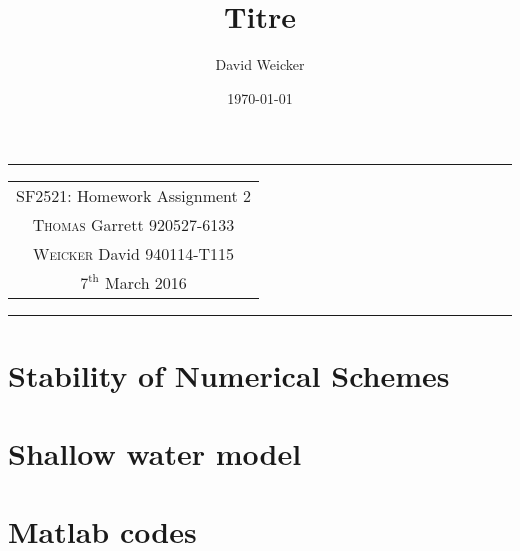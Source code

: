 \documentclass[11pt,a4paper]{article}
\title{Titre}
\author{David Weicker}
\date{\today}
\begin{document}
\tabulinesep=1.2mm
\begin{center}
\hrule
\begin{tabular}{c}
\\[0.005cm]
\Large{SF2521: Homework Assignment 2}\\[0.3cm] %
\textsc{Thomas} Garrett  920527-6133\\[0.2cm]
\textsc{Weicker} David     940114-T115\\[0.2cm]
$\text{7}^{\text{th}}$ March 2016\\[0.2cm] %
\end{tabular}
\hrule
\end{center}

\section{Stability of Numerical Schemes}


\section{Shallow water model}




\FloatBarrier
\section{Matlab codes}



\end{document}
